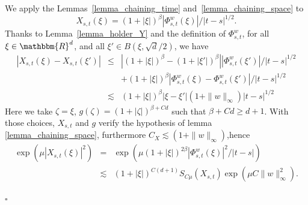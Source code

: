 \documentclass[a4paper,11pt]{article}
\newenvironment{proof}{{\sc Proof.}}{\hfill$\square$}
\begin{document}
\begin{proof}
  We apply the Lemmas~\ref{lemma_chaining_time} and~\ref{lemma_chaining_space}
  to
  \[ X_{s,t} ( \xi ) = ( 1+ | \xi | )^{\beta} | \Phi_{s,t}^{w} ( \xi ) | / |
     t-s |^{1/2}. \]
  Thanks to Lemma~\ref{lemma_holder_Y} and the definition of $\Phi^{w}_{s,t}$,
  for all $\xi \in \mathbbm{R}^{d}$, and all $\xi' \in B \left( \xi , \sqrt{d}
  /2 \right)$, we have
  \begin{eqnarray*}
    | X_{s,t} ( \xi ) -X_{s,t} ( \xi' ) | & \leqslant & | ( 1+ | \xi |
    )^{\beta} - ( 1+ | \xi' | )^{\beta} |   | \Phi^{w}_{s,t} ( \xi' ) | / |
    t-s |^{1/2}\\
    &  & + ( 1+ | \xi | )^{\beta} | \Phi^{w}_{s,t} ( \xi ) - \Phi^{w}_{s,t} (
    \xi' ) | / | t-s |^{1/2}\\
    & \lesssim & ( 1+ | \xi | )^{\beta} | \xi - \xi' | ( 1+ \| w \|_{\infty}
    ) | t-s |^{1/2}
  \end{eqnarray*}
  Here we take $\zeta = \xi$, $g ( \zeta ) = ( 1+ | \zeta | )^{\beta +C d}$
  such that $\beta +C d \geqslant d+1$. With those choices, $X_{s,t}$ and $g$
  verify the hypothesis of lemma \ref{lemma_chaining_space}, furthermore
  $C_{X} \lesssim ( 1+ \| w \|_{\infty} )$,hence
  \begin{eqnarray*}
    \exp ( \mu | X_{s,t} ( \xi ) |^{2} ) & = & \exp ( \mu ( 1+ | \xi | )^{2
    \beta} | \Phi^{w}_{s,t} ( \xi ) |^{2} / | t-s | )\\
    & \lesssim & ( 1+ | \xi | )^{C ( d+1 )} S_{C \mu} ( X_{s,t} ) \exp ( \mu
    C \| w \|_{\infty}^{2} ).
  \end{eqnarray*}
  

\end{proof}
\end{document}
